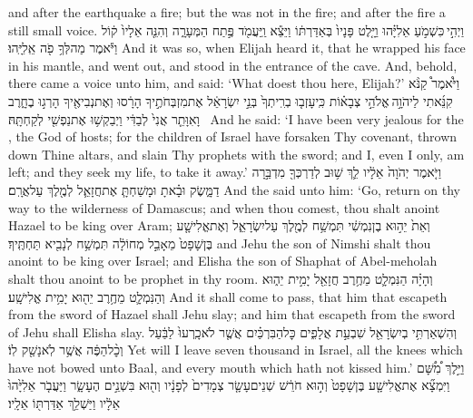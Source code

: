 {and after the earthquake a fire; but the \lord\space was not in the fire; and after the fire a still small voice.}
{וַיְהִ֣י \legarmeh  כִּשְׁמֹ֣עַ אֵלִיָּ֗הוּ וַיָּ֤לֶט פָּנָיו֙ בְּאַדַּרְתּ֔וֹ וַיֵּצֵ֕א וַֽיַּעֲמֹ֖ד פֶּ֣תַח הַמְּעָרָ֑ה וְהִנֵּ֤ה אֵלָיו֙ ק֔וֹל וַיֹּ֕אמֶר מַה\maqqaf לְּךָ֥ פֹ֖ה אֵֽלִיָּֽהוּ׃}
{And it was so, when Elijah heard it, that he wrapped his face in his mantle, and went out, and stood in the entrance of the cave. And, behold, there came a voice unto him, and said: ‘What doest thou here, Elijah?’}
{וַיֹּ֩אמֶר֩ קַנֹּ֨א קִנֵּ֜אתִי לַיהֹוָ֣ה \legarmeh  אֱלֹהֵ֣י צְבָא֗וֹת כִּֽי\maqqaf עָזְב֤וּ בְרִֽיתְךָ֙ בְּנֵ֣י יִשְׂרָאֵ֔ל אֶת\maqqaf מִזְבְּחֹתֶ֣יךָ הָרָ֔סוּ וְאֶת\maqqaf נְבִיאֶ֖יךָ הָרְג֣וּ בֶחָ֑רֶב וָאִוָּתֵ֤ר אֲנִי֙ לְבַדִּ֔י וַיְבַקְשׁ֥וּ אֶת\maqqaf נַפְשִׁ֖י לְקַחְתָּֽהּ׃ \setuma }
{And he said: ‘I have been very jealous for the \lord, the God of hosts; for the children of Israel have forsaken Thy covenant, thrown down Thine altars, and slain Thy prophets with the sword; and I, even I only, am left; and they seek my life, to take it away.’}
{וַיֹּ֤אמֶר יְהֹוָה֙ אֵלָ֔יו לֵ֛ךְ שׁ֥וּב לְדַרְכְּךָ֖ מִדְבַּ֣רָה דַמָּ֑שֶׂק וּבָ֗אתָ וּמָשַׁחְתָּ֧ אֶת\maqqaf חֲזָאֵ֛ל לְמֶ֖לֶךְ עַל\maqqaf אֲרָֽם׃}
{And the \lord\space said unto him: ‘Go, return on thy way to the wilderness of Damascus; and when thou comest, thou shalt anoint Hazael to be king over Aram;}
{וְאֵת֙ יֵה֣וּא בֶן\maqqaf נִמְשִׁ֔י תִּמְשַׁ֥ח לְמֶ֖לֶךְ עַל\maqqaf יִשְׂרָאֵ֑ל וְאֶת\maqqaf אֱלִישָׁ֤ע בֶּן\maqqaf שָׁפָט֙ מֵאָבֵ֣ל מְחוֹלָ֔ה תִּמְשַׁ֥ח לְנָבִ֖יא תַּחְתֶּֽיךָ׃}
{and Jehu the son of Nimshi shalt thou anoint to be king over Israel; and Elisha the son of Shaphat of Abel-meholah shalt thou anoint to be prophet in thy room.}
{וְהָיָ֗ה הַנִּמְלָ֛ט מֵחֶ֥רֶב חֲזָאֵ֖ל יָמִ֣ית יֵה֑וּא וְהַנִּמְלָ֛ט מֵחֶ֥רֶב יֵה֖וּא יָמִ֥ית אֱלִישָֽׁע׃}
{And it shall come to pass, that him that escapeth from the sword of Hazael shall Jehu slay; and him that escapeth from the sword of Jehu shall Elisha slay.}
{וְהִשְׁאַרְתִּ֥י בְיִשְׂרָאֵ֖ל שִׁבְעַ֣ת אֲלָפִ֑ים כׇּל\maqqaf הַבִּרְכַּ֗יִם אֲשֶׁ֤ר לֹא\maqqaf כָֽרְעוּ֙ לַבַּ֔עַל וְכׇ֨ל\maqqaf הַפֶּ֔ה אֲשֶׁ֥ר לֹֽא\maqqaf נָשַׁ֖ק לֽוֹ׃}
{Yet will I leave seven thousand in Israel, all the knees which have not bowed unto Baal, and every mouth which hath not kissed him.’}
{וַיֵּ֣לֶךְ מִ֠שָּׁ֠ם וַיִּמְצָ֞א אֶת\maqqaf אֱלִישָׁ֤ע בֶּן\maqqaf שָׁפָט֙ וְה֣וּא חֹרֵ֔שׁ שְׁנֵים\maqqaf עָשָׂ֤ר צְמָדִים֙ לְפָנָ֔יו וְה֖וּא בִּשְׁנֵ֣ים הֶעָשָׂ֑ר וַיַּעֲבֹ֤ר אֵלִיָּ֙הוּ֙ אֵלָ֔יו וַיַּשְׁלֵ֥ךְ אַדַּרְתּ֖וֹ אֵלָֽיו׃}
